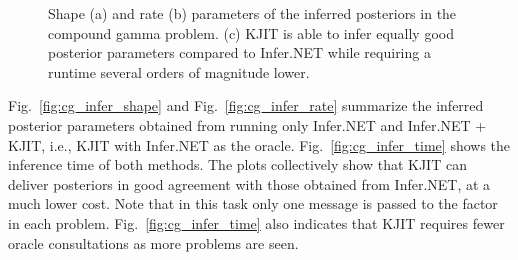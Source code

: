 \documentclass[english]{article}
\theoremstyle{plain}
\theoremstyle{plain}
\newcommand{\figref}[1]{Fig.~\ref{#1}}
\begin{document}
\begin{figure}[ht]
  \centering
  \caption{Shape (a) and rate (b) parameters of the inferred posteriors in 
  the compound gamma problem. 
  (c) KJIT is able to infer equally good posterior parameters compared to Infer.NET 
  while requiring a runtime several orders of magnitude lower. }
  \label{fig:cg_performance}
\end{figure}

\figref{fig:cg_infer_shape} and \figref{fig:cg_infer_rate} summarize the inferred 
posterior parameters obtained from running only Infer.NET and Infer.NET + KJIT, i.e., 
KJIT with Infer.NET as the oracle. \figref{fig:cg_infer_time} shows the inference 
time of both methods. The plots collectively show that KJIT can deliver posteriors 
in good agreement with those obtained from Infer.NET, at a much lower cost. 
Note that in this task only one message is passed to the factor in each problem.
\figref{fig:cg_infer_time} also indicates that KJIT requires fewer oracle 
consultations as more problems are seen.
\end{document}
